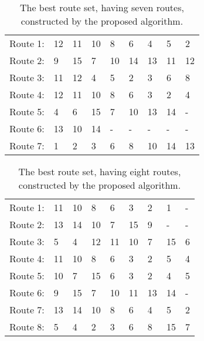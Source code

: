 
\begin{table}[H]
    \centering
    \begin{tabular}{|l|l l l l l l l l|}
    \hline
    Route 1: & 12 & 11 & 10 & 8 & 6 & 4 & 5 & 2 \\
    Route 2: & 9 & 15 & 7 & 10 & 14 & 13 & 11 & 12 \\
    Route 3: & 11 & 12 & 4 & 5 & 2 & 3 & 6 & 8 \\
    Route 4: & 12 & 11 & 10 & 8 & 6 & 3 & 2 & 4 \\
    Route 5: & 4 & 6 & 15 & 7 & 10 & 13 & 14 & - \\
    Route 6: & 13 & 10 & 14 & - & - & - & - & - \\
    Route 7: & 1 & 2 & 3 & 6 & 8 & 10 & 14 & 13 \\
    \hline
    \end{tabular}
    \caption {The best route set, having seven routes, constructed by the proposed algorithm. }
    \label{table:performanceComparison_bestRouteSet7}
\end{table}

\begin{table}[H]
    \centering
    \begin{tabular}{|l|l l l l l l l l|}
    \hline 
    Route 1: & 11 & 10 & 8 & 6 & 3 & 2 & 1 & - \\
    Route 2: & 13 & 14 & 10 & 7 & 15 & 9 & - & - \\
    Route 3: & 5 & 4 & 12 & 11 & 10 & 7 & 15 & 6 \\
    Route 4: & 11 & 10 & 8 & 6 & 3 & 2 & 5 & 4 \\
    Route 5: & 10 & 7 & 15 & 6 & 3 & 2 & 4 & 5 \\
    Route 6: & 9 & 15 & 7 & 10 & 11 & 13 & 14 & - \\
    Route 7: & 13 & 14 & 10 & 8 & 6 & 4 & 5 & 2 \\
    Route 8: & 5 & 4 & 2 & 3 & 6 & 8 & 15 & 7 \\
    \hline
    \end{tabular}
    \caption {The best route set, having eight routes, constructed by the proposed algorithm. }
    \label{table:performanceComparison_bestRouteSet8}
\end{table}


